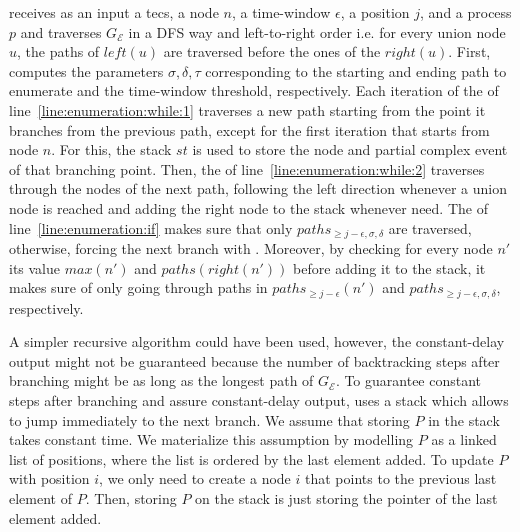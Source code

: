 
 receives as an input a \acrshort{tecs}, a node $n$, a time-window $\epsilon$, a position $j$, and a process $p$ and traverses $G_{\mathcal{E}}$ in a DFS way and left-to-right order i.e. for every union node $u$, the paths of $left(u)$ are traversed before the ones of the $right(u)$. First, computes the parameters $\sigma, \delta, \tau$ corresponding to the starting and ending path to enumerate and the time-window threshold, respectively. Each iteration of the  of line~\ref{line:enumeration:while:1} traverses a new path starting from the point it branches from the previous path, except for the first iteration that starts from node $n$. For this, the stack $st$ is used to store the node and partial complex event of that branching point. Then, the  of line~\ref{line:enumeration:while:2} traverses through the nodes of the next path, following the left direction whenever a union node is reached and adding the right node to the stack whenever need. The  of line~\ref{line:enumeration:if} makes sure that only $paths_{\ge j - \epsilon, \sigma, \delta}$ are traversed, otherwise, forcing the next branch with . Moreover, by checking for every node $n'$ its value $max(n')$ and $paths(right(n'))$ before adding it to the stack, it makes sure of only going through paths in $paths_{\ge j - \epsilon}(n')$ and $paths_{\ge j - \epsilon, \sigma, \delta}$, respectively.

A simpler recursive algorithm could have been used, however, the constant-delay output might not be guaranteed because the number of backtracking steps after branching might be as long as the longest path of $G_{\mathcal{E}}$. To guarantee constant steps after branching and assure constant-delay output,  uses a stack which allows to jump immediately to the next branch. We assume that storing $P$ in the stack takes constant time. We materialize this assumption by modelling $P$ as a linked list of positions, where the list is ordered by the last element added. To update $P$ with position $i$, we only need to create a node $i$ that points to the previous last element of $P$. Then, storing $P$ on the stack is just storing the pointer of the last element added.

